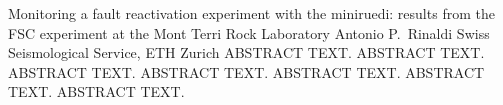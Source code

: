 \begin{conf-abstract}
{Monitoring a fault reactivation experiment with the miniruedi: results from the FSC experiment at the Mont Terri Rock Laboratory}
{Antonio P.\ Rinaldi}
{Swiss Seismological Service, ETH Zurich}
{ABSTRACT TEXT. ABSTRACT TEXT. ABSTRACT TEXT. ABSTRACT TEXT. ABSTRACT TEXT. ABSTRACT TEXT. ABSTRACT TEXT.}
\end{conf-abstract}
